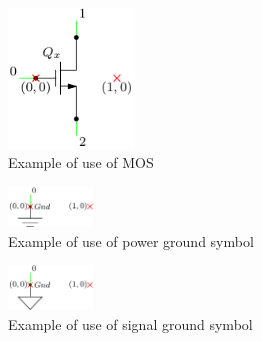\documentclass[a4paper,12pt]{report}
\begin{document}
\begin{figure}[h]
\centering
\includegraphics[width=0.3\textwidth]{mosInfo}
\caption{Example of use of MOS}
\label{mosInfo} %
\end{figure}

\begin{figure}[h]
\centering
\includegraphics[width=0.2\textwidth]{gndPowerInfo}
\caption{Example of use of power ground symbol}
\label{gndPowerInfo} %
\end{figure}

\begin{figure}[h]
\centering
\includegraphics[width=0.2\textwidth]{gndSignalInfo}
\caption{Example of use of signal ground symbol}
\label{gndSignalInfo} %
\end{figure}
\end{document}
